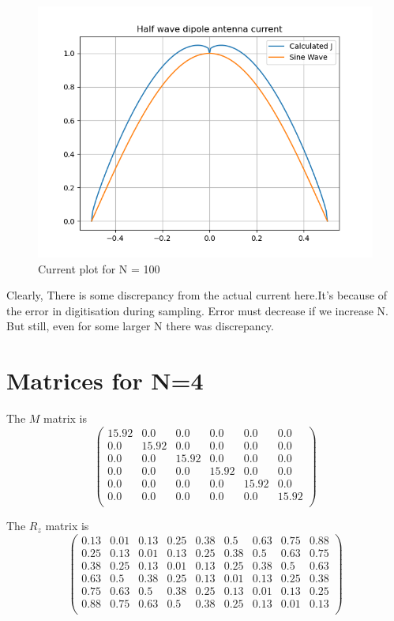 \documentclass[12pt, a4paper]{report}
\begin{document}
 \begin{figure}[!tbh]
   	\centering
   	\includegraphics[scale=0.7]{Q5b.png}
	\caption{Current plot for N = 100}
 \end{figure} 
 \newpage
 Clearly, There is some discrepancy from the actual current here.It's because of the error in digitisation during sampling. Error must decrease if we increase N. But still, even for some larger N there was discrepancy.
  \section*{Matrices for N=4}
  
   The $M$ matrix is 
\begin{equation*}
\begin{pmatrix}
15.92 & 0.0 & 0.0 & 0.0 & 0.0 & 0.0\\
0.0 & 15.92 & 0.0 & 0.0 & 0.0 & 0.0\\
0.0 & 0.0 & 15.92 & 0.0 & 0.0 & 0.0\\
0.0 & 0.0 & 0.0 & 15.92 & 0.0 & 0.0\\
0.0 & 0.0 & 0.0 & 0.0 & 15.92 & 0.0\\
0.0 & 0.0 & 0.0 & 0.0 & 0.0 & 15.92\\
\end{pmatrix}
\end{equation*}
\vspace{0.5cm}
 
 The $R_z$ matrix is 
\begin{equation*}
    \begin{pmatrix}
0.13 & 0.01 & 0.13 & 0.25 & 0.38 & 0.5 & 0.63 & 0.75 & 0.88\\
0.25 & 0.13 & 0.01 & 0.13 & 0.25 & 0.38 & 0.5 & 0.63 & 0.75\\
0.38 & 0.25 & 0.13 & 0.01 & 0.13 & 0.25 & 0.38 & 0.5 & 0.63\\
0.63 & 0.5 & 0.38 & 0.25 & 0.13 & 0.01 & 0.13 & 0.25 & 0.38\\
0.75 & 0.63 & 0.5 & 0.38 & 0.25 & 0.13 & 0.01 & 0.13 & 0.25\\
0.88 & 0.75 & 0.63 & 0.5 & 0.38 & 0.25 & 0.13 & 0.01 & 0.13\\
\end{pmatrix}
\end{equation*}
\vspace{0.5cm}
\end{document}
